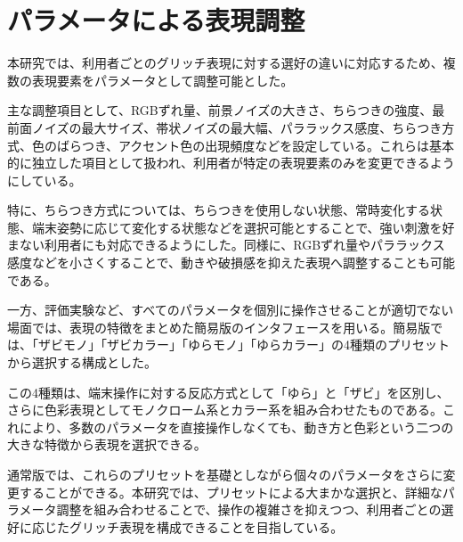 \section{パラメータによる表現調整}

本研究では、利用者ごとのグリッチ表現に対する選好の違いに対応するため、複数の表現要素をパラメータとして調整可能とした。

主な調整項目として、RGBずれ量、前景ノイズの大きさ、ちらつきの強度、最前面ノイズの最大サイズ、帯状ノイズの最大幅、パララックス感度、ちらつき方式、色のばらつき、アクセント色の出現頻度などを設定している。これらは基本的に独立した項目として扱われ、利用者が特定の表現要素のみを変更できるようにしている。

特に、ちらつき方式については、ちらつきを使用しない状態、常時変化する状態、端末姿勢に応じて変化する状態などを選択可能とすることで、強い刺激を好まない利用者にも対応できるようにした。同様に、RGBずれ量やパララックス感度などを小さくすることで、動きや破損感を抑えた表現へ調整することも可能である。

一方、評価実験など、すべてのパラメータを個別に操作させることが適切でない場面では、表現の特徴をまとめた簡易版のインタフェースを用いる。簡易版では、「ザビモノ」「ザビカラー」「ゆらモノ」「ゆらカラー」の4種類のプリセットから選択する構成とした。

この4種類は、端末操作に対する反応方式として「ゆら」と「ザビ」を区別し、さらに色彩表現としてモノクローム系とカラー系を組み合わせたものである。これにより、多数のパラメータを直接操作しなくても、動き方と色彩という二つの大きな特徴から表現を選択できる。

通常版では、これらのプリセットを基礎としながら個々のパラメータをさらに変更することができる。本研究では、プリセットによる大まかな選択と、詳細なパラメータ調整を組み合わせることで、操作の複雑さを抑えつつ、利用者ごとの選好に応じたグリッチ表現を構成できることを目指している。